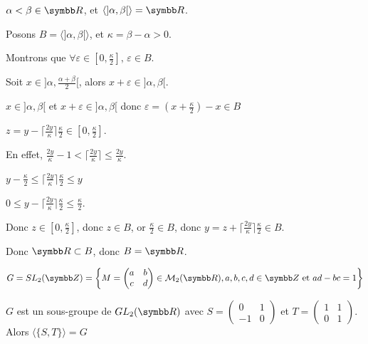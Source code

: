 \begin{exemple}
    $\alpha < \beta \in \R$, et $\langle ]\alpha, \beta[ \rangle = \R$.

    Posons $B = \langle ]\alpha, \beta[ \rangle$, et $\kappa = \beta - \alpha > 0$.

    Montrons que $\forall \varepsilon \in [0, \frac{\kappa} 2], \, \varepsilon \in B$.

    Soit $x \in ]\alpha, \frac{\alpha + \beta} 2[$, alors $x + \varepsilon \in ]\alpha, \beta[$.

    $x \in ]\alpha, \beta[$ et $x + \varepsilon \in ]\alpha, \beta[$ donc $\varepsilon = \left(x + \frac{\kappa}{2}\right) - x \in B$

    $z = y - \lceil \frac {2y} \kappa \rceil \frac \kappa 2 \in [0, \frac \kappa 2]$. 

    En effet, $\frac{2y} \kappa - 1 < \lceil \frac {2y} \kappa \rceil \leq \frac {2y} \kappa$.

    $y - \frac{\kappa }{2 } \leqslant \lceil \frac {2y} \kappa \rceil \frac \kappa 2 \leqslant y$

    $0 \leqslant y - \lceil \frac {2y} \kappa \rceil \frac \kappa 2 \leqslant \frac \kappa 2$.

    Donc $z \in [0, \frac \kappa 2]$, donc $z \in B$, or $\frac \kappa 2 \in B$, donc $y = z + \lceil \frac {2y} \kappa \rceil \frac \kappa 2 \in B$.

    Donc $\R \subset B$, donc $B = \R$.
\end{exemple}


\begin{exemple}
    $G = SL_2(\Z) = \left\{ M = \begin{pmatrix}
    a & b \\
    c & d
    \end{pmatrix} \in \mathcal M_2(\R), a, b, c, d \in \Z \text{ et } ad - bc = 1 \right\}$ 

    $G$ est un sous-groupe de $GL_2(\R)$ avec $S = \begin{pmatrix}
    0 & 1 \\
    -1 & 0
    \end{pmatrix}$ et $T = \begin{pmatrix}
    1 & 1 \\
    0 & 1
    \end{pmatrix}$.
    Alors $\langle \{S, T\} \rangle = G$
\end{exemple}
